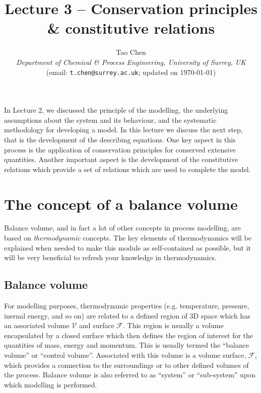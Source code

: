 \documentclass[a4paper,11pt]{article}
\title{\vspace{-2cm} Lecture 3 -- Conservation principles \& constitutive relations}
\author{Tao Chen\\
{\small \emph{Department of Chemical \& Process Engineering, University of Surrey, UK}}\\
{\small (email: \texttt{t.chen@surrey.ac.uk}; \hspace{0.5cm} updated on \today )}
}
\date{}
\theoremstyle{definition}
\begin{document}
\maketitle

\vspace{-0.5cm}

In Lecture 2, we discussed the principle of the modelling, the underlying assumptions about the system and its behaviour, 
and the systematic methodology for developing a model. In this lecture we discuss the next step, that is the development
of the describing equations. One key aspect in this process is the application of conservation principles for conserved extensive quantities. 
Another important aspect is the development of the constitutive relations which provide a set of relations which
are used to complete the model.

\section{The concept of a balance volume}

Balance volume, and in fact a lot of other concepts in process modelling, are based on \emph{thermodynamic} concepts.
The key elements of thermodynamics will be explained when needed to make this module as self-contained as possible,
but it will be very beneficial to refresh your knowledge in thermodynamics.


\subsection*{Balance volume} 

For modelling purposes, thermodynamic properties (e.g. temperature, pressure, inernal energy, and so on)
are related to a defined region of
3D space which has an associated volume $\mathcal{V}$ and surface $\mathcal{F}$. This region is usually a
volume encapsulated by a closed surface which then defines the region of interest for
the quantities of mass, energy and momentum. This is usually termed the ``balance
volume'' or ``control volume''. Associated with this volume is a volume surface, $\mathcal{F}$,
which provides a connection to the surroundings or to other defined volumes of the
process. Balance volume is also referred to as ``system'' or ``sub-system'' upon which modelling is performed.
\end{document}
